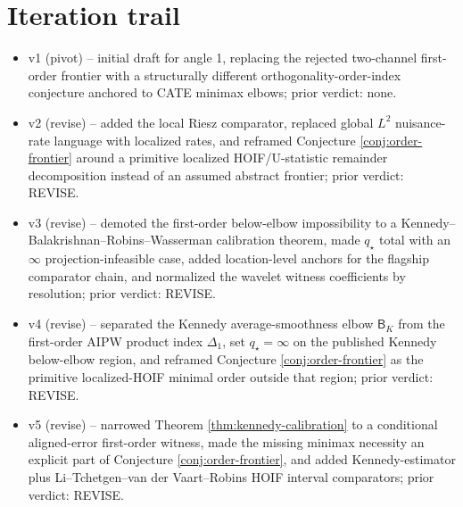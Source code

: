 \documentclass[11pt]{article}
\theoremstyle{definition}
\theoremstyle{plain}
\theoremstyle{remark}
\begin{document}
\section{Iteration trail}
\begin{itemize}[leftmargin=*]
\item v1 (pivot) -- initial draft for angle 1, replacing the rejected
two-channel first-order frontier with a structurally different
orthogonality-order-index conjecture anchored to CATE minimax elbows; prior
verdict: none.
\item v2 (revise) -- added the local Riesz comparator, replaced global
\(L^2\) nuisance-rate language with localized rates, and reframed Conjecture
\ref{conj:order-frontier} around a primitive localized HOIF/U-statistic
remainder decomposition instead of an assumed abstract frontier; prior
verdict: REVISE.
\item v3 (revise) -- demoted the first-order below-elbow impossibility to a
Kennedy--Balakrishnan--Robins--Wasserman calibration theorem, made
\(q_\star\) total with an \(\infty\) projection-infeasible case, added
location-level anchors for the flagship comparator chain, and normalized the
wavelet witness coefficients by resolution; prior verdict: REVISE.
\item v4 (revise) -- separated the Kennedy average-smoothness elbow
\(\mathsf B_K\) from the first-order AIPW product index \(\Delta_1\), set
\(q_\star=\infty\) on the published Kennedy below-elbow region, and reframed
Conjecture \ref{conj:order-frontier} as the primitive localized-HOIF minimal
order outside that region; prior verdict: REVISE.
\item v5 (revise) -- narrowed Theorem \ref{thm:kennedy-calibration} to a
conditional aligned-error first-order witness, made the missing minimax
necessity an explicit part of Conjecture \ref{conj:order-frontier}, and added
Kennedy-estimator plus Li--Tchetgen--van der Vaart--Robins HOIF interval
comparators; prior verdict: REVISE.
\end{itemize}
\end{document}
